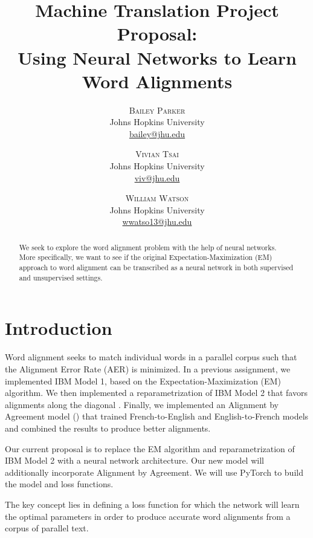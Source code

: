 \documentclass[twoside,twocolumn]{article}
\title{Machine Translation Project Proposal: \\ Using Neural Networks to Learn
Word Alignments}
\author{%
\textsc{Bailey Parker} \\[1ex]
\normalsize Johns Hopkins University \\
\normalsize \href{mailto:bailey@jhu.edu}{bailey@jhu.edu}
 \and
 \textsc{Vivian Tsai} \\[1ex]
\normalsize Johns Hopkins University \\
\normalsize \href{mailto:viv@jhu.edu}{viv@jhu.edu}
 \and
  \textsc{William Watson} \\[1ex]
\normalsize Johns Hopkins University \\
\normalsize \href{mailto:wwatso13@jhu.edu}{wwatso13@jhu.edu}
}
\date{}
\begin{document}
\maketitle




\begin{abstract}
We seek to explore the word alignment problem with the help of neural networks.
More specifically, we want to see if the original Expectation-Maximization
(EM) approach to word alignment can be transcribed as a neural network in both
supervised and unsupervised settings. %
\end{abstract}



\section{Introduction}

Word alignment seeks to match individual words in a parallel corpus such that
the Alignment Error Rate (AER) is minimized. In a previous assignment, we
implemented IBM Model 1, based on the Expectation-Maximization (EM)
algorithm. We then implemented a reparametrization of IBM Model 2 that favors
alignments along the diagonal \cite{dyer2013simple}. Finally, we implemented an
Alignment by Agreement model (\cite{liang2006alignment}) that trained
French-to-English and English-to-French models and combined the results
to produce better alignments.

Our current proposal is to replace the EM algorithm and
reparametrization of IBM Model 2 with a neural network architecture. Our new
model will additionally incorporate Alignment by Agreement. We will use
PyTorch to build the model and loss functions.

The key concept lies in defining a loss function for which the network will
learn the optimal parameters in order to produce accurate word alignments
from a corpus of parallel text.
\end{document}
